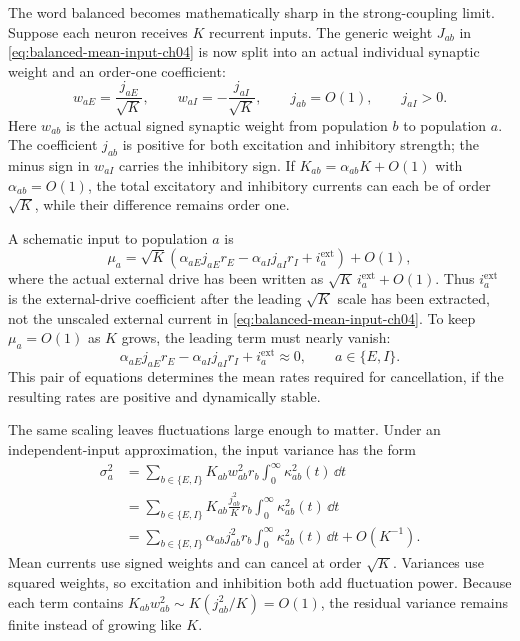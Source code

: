 The word balanced becomes mathematically sharp in the strong-coupling limit. Suppose each neuron receives $K$ recurrent inputs. The generic weight $J_{ab}$ in \cref{eq:balanced-mean-input-ch04} is now split into an actual individual synaptic weight and an order-one coefficient:
%
\begin{equation}
  w_{aE}
  =
  \frac{j_{aE}}{\sqrt K},
  \qquad
  w_{aI}
  =
  -\frac{j_{aI}}{\sqrt K},
  \qquad
  j_{ab}=O(1),
  \qquad
  j_{aI}>0 .
  \label{eq:strong-coupling-weight-scaling}
\end{equation}
%
Here $w_{ab}$ is the actual signed synaptic weight from population $b$ to population $a$. The coefficient $j_{ab}$ is positive for both excitation and inhibitory strength; the minus sign in $w_{aI}$ carries the inhibitory sign. If $K_{ab}=\alpha_{ab}K+O(1)$ with $\alpha_{ab}=O(1)$, the total excitatory and inhibitory currents can each be of order $\sqrt K$, while their difference remains order one.

A schematic input to population $a$ is
%
\begin{equation}
  \mu_a
  =
  \sqrt K
  \left(
    \alpha_{aE}j_{aE}r_E
    -
    \alpha_{aI}j_{aI}r_I
    +
    i_a^{\mathrm{ext}}
  \right)
  +
  O(1),
  \label{eq:strong-coupling-mean-input}
\end{equation}
%
where the actual external drive has been written as $\sqrt K\,i_a^{\mathrm{ext}}+O(1)$. Thus $i_a^{\mathrm{ext}}$ is the external-drive coefficient after the leading $\sqrt K$ scale has been extracted, not the unscaled external current in \cref{eq:balanced-mean-input-ch04}. To keep $\mu_a=O(1)$ as $K$ grows, the leading term must nearly vanish:
%
\begin{equation}
  \alpha_{aE}j_{aE}r_E
  -
  \alpha_{aI}j_{aI}r_I
  +
  i_a^{\mathrm{ext}}
  \approx
  0,
  \qquad
  a\in\{E,I\}.
  \label{eq:leading-balance-condition}
\end{equation}
%
This pair of equations determines the mean rates required for cancellation, if the resulting rates are positive and dynamically stable.

The same scaling leaves fluctuations large enough to matter. Under an independent-input approximation, the input variance has the form
%
\begin{equation}
  \begin{aligned}
  \sigma_a^2
  &=
  \sum_{b\in\{E,I\}}
  K_{ab}w_{ab}^2 r_b
  \int_0^\infty\kappa_{ab}^2(t)\,\dd t
  \\
  &=
  \sum_{b\in\{E,I\}}
  K_{ab}
  \frac{j_{ab}^2}{K}
  r_b
  \int_0^\infty\kappa_{ab}^2(t)\,\dd t
  \\
  &=
  \sum_{b\in\{E,I\}}
  \alpha_{ab}j_{ab}^2 r_b
  \int_0^\infty\kappa_{ab}^2(t)\,\dd t
  +
  O(K^{-1}) .
  \end{aligned}
  \label{eq:balanced-variance-ch04}
\end{equation}
%
Mean currents use signed weights and can cancel at order $\sqrt K$. Variances use squared weights, so excitation and inhibition both add fluctuation power. Because each term contains $K_{ab}w_{ab}^2\sim K(j_{ab}^2/K)=O(1)$, the residual variance remains finite instead of growing like $K$.

